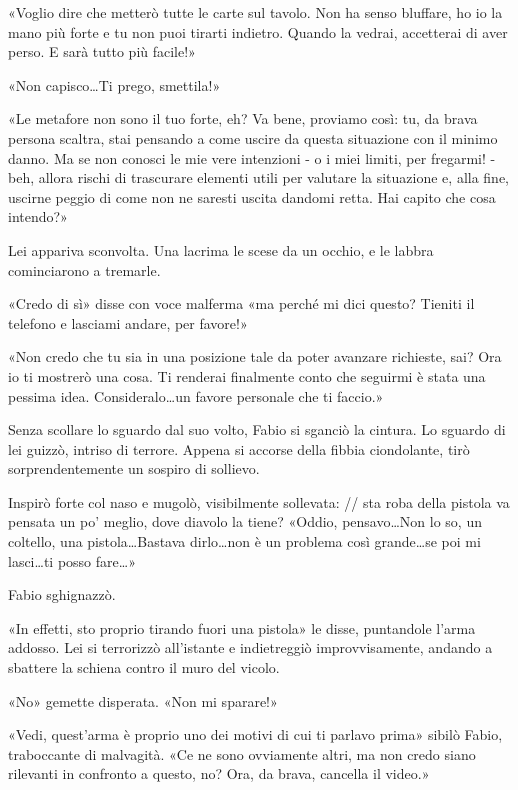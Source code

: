 «Voglio dire che metterò tutte le carte sul tavolo. Non ha senso bluffare, ho io la mano più forte e tu non puoi tirarti indietro. Quando la vedrai, accetterai di aver perso. E sarà tutto più facile!»

«Non capisco\ldots Ti prego, smettila!»

«Le metafore non sono il tuo forte, eh? Va bene, proviamo così: tu, da brava persona scaltra, stai pensando a come uscire da questa situazione con il minimo danno. Ma se non conosci le mie vere intenzioni - o i miei limiti, per fregarmi! - beh, allora rischi di trascurare elementi utili per valutare la situazione e, alla fine, uscirne peggio di come non ne saresti uscita dandomi retta. Hai capito che cosa intendo?»

Lei appariva sconvolta. Una lacrima le scese da un occhio, e le labbra cominciarono a tremarle.

«Credo di sì» disse con voce malferma «ma perché mi dici questo? Tieniti il telefono e lasciami andare, per favore!»

«Non credo che tu sia in una posizione tale da poter avanzare richieste, sai? Ora io ti mostrerò una cosa. Ti renderai finalmente conto che seguirmi è stata una pessima idea. Consideralo\ldots un favore personale che ti faccio.»

Senza scollare lo sguardo dal suo volto, Fabio si sganciò la cintura. Lo sguardo di lei guizzò, intriso di terrore. Appena si accorse della fibbia ciondolante, tirò sorprendentemente un sospiro di sollievo.

Inspirò forte col naso e mugolò, visibilmente sollevata:
// sta roba della pistola va pensata un po' meglio, dove diavolo la tiene?
«Oddio, pensavo\ldots Non lo so, un coltello, una pistola\ldots Bastava dirlo\ldots non è un problema così grande\ldots se poi mi lasci\ldots ti posso fare\ldots»

Fabio sghignazzò.

«In effetti, sto proprio tirando fuori una pistola» le disse, puntandole l'arma addosso. Lei si terrorizzò all'istante e indietreggiò improvvisamente, andando a sbattere la schiena contro il muro del vicolo.

«No» gemette disperata. «Non mi sparare!»

«Vedi, quest'arma è proprio uno dei motivi di cui ti parlavo prima» sibilò Fabio, traboccante di malvagità. «Ce ne sono ovviamente altri, ma non credo siano rilevanti in confronto a questo, no? Ora, da brava, cancella il video.»

